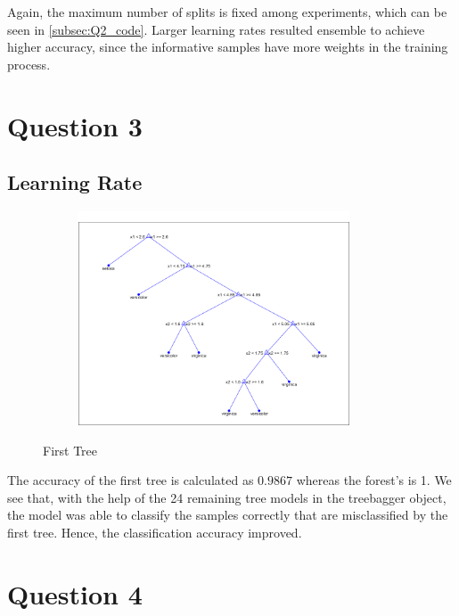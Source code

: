 \documentclass[11pt]{extarticle}
\begin{document}
Again, the maximum number of splits is fixed among experiments, which can be seen in \ref{subsec:Q2_code}. Larger learning rates resulted ensemble to achieve higher accuracy, since the informative samples have more weights in the training process.

\section{Question 3}
\subsection{Learning Rate}
\begin{figure}[h]
    \centering
    {\includegraphics[width = 4in, height = 2.5in]{Q3tree.png}}
    \caption{First Tree}
    \label{fig:q3_tr}
\end{figure}

The accuracy of the first tree is calculated as $0.9867$ whereas the forest's is 1. We see that, with the help of the 24 remaining tree models in the treebagger object, the model was able to classify the samples correctly that are misclassified by the first tree. Hence, the classification accuracy improved. 

\section{Question 4}
\end{document}
